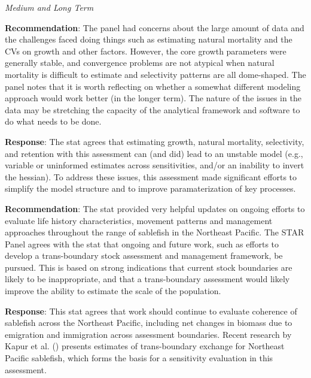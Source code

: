 \documentclass[
  english,
]{article}
\begin{document}
\emph{Medium and Long Term}

\textbf{Recommendation}: The panel had concerns about the large amount
of data and the challenges faced doing things such as estimating natural
mortality and the CVs on growth and other factors. However, the core
growth parameters were generally stable, and convergence problems are
not atypical when natural mortality is difficult to estimate and
selectivity patterns are all dome-shaped. The panel notes that it is
worth reflecting on whether a somewhat different modeling approach would
work better (in the longer term). The nature of the issues in the data
may be stretching the capacity of the analytical framework and software
to do what needs to be done.

\textbf{Response}: The \gls{stat} agrees that estimating growth, natural
mortality, selectivity, and retention with this assessment can (and did)
lead to an unstable model (e.g., variable or uninformed estimates across
sensitivities, and/or an inability to invert the hessian). To address
these issues, this assessment made significant efforts to simplify the
model structure and to improve paramaterization of key processes.

\textbf{Recommendation}: The \gls{stat} provided very helpful updates on
ongoing efforts to evaluate life history characteristics, movement
patterns and management approaches throughout the range of sablefish in
the Northeast Pacific. The STAR Panel agrees with the \gls{stat} that
ongoing and future work, such as efforts to develop a trans-boundary
stock assessment and management framework, be pursued. This is based on
strong indications that current stock boundaries are likely to be
inappropriate, and that a trans-boundary assessment would likely improve
the ability to estimate the scale of the population.

\textbf{Response}: This \gls{stat} agrees that work should continue to
evaluate coherence of sablefish across the Northeast Pacific, including
net changes in biomass due to emigration and immigration across
assessment boundaries. Recent research by Kapur et al.
() presents estimates of
trans-boundary exchange for Northeast Pacific sablefish, which forms the
basis for a sensitivity evaluation in this assessment.
\end{document}
